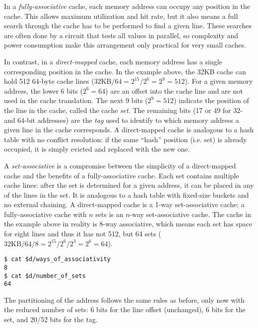 In a \textit{fully-associative} cache, each memory address can occupy any
position in the cache.  This allows maximum utilization and hit rate, but it
also means a full search through the cache has to be performed to find a given
line.  These searches are often done by a circuit that tests all values in
parallel, so complexity and power consumption make this arrangement only
practical for very small caches.

In contrast, in a \textit{direct-mapped} cache, each memory address has a single
corresponding position in the cache.  In the example above, the 32KB cache can
hold 512 64-byte cache lines ($32\text{KB} / 64 = 2^{15} / 2^6 = 2^9 = 512$).
For a given memory address, the lower 6 bits ($2^6 = 64$) are an offset into the
cache line and are not used in the cache translation.  The next 9 bits ($2^9 =
512$) indicate the position of the line in the cache, called the cache
\textit{set}.  The remaining bits (17 or 49 for 32- and 64-bit addresses) are
the \textit{tag} used to identify to which memory address a given line in the
cache corresponds.  A direct-mapped cache is analogous to a hash table with no
conflict resolution: if the same ``hash'' position (i.e. set) is already
occupied, it is simply evicted and replaced with the new one.

A \textit{set-associative} is a compromise between the simplicity of a
direct-mapped cache and the benefits of a fully-associative cache.  Each set
contains multiple cache lines: after the set is determined for a given address,
it can be placed in any of the lines in the set.  It is analogous to a hash
table with fixed-size buckets and no external chaining.  A direct-mapped cache
is a 1-way set-associative cache; a fully-associative cache with $n$ sets is an
$n$-way set-associative cache.  The cache in the example above in reality is
8-way associative, which means each set has space for eight lines and thus it
has not 512, but 64 sets ($32\text{KB} / 64 / 8 = 2^{15} / 2^6 / 2^3 = 2^6 =
64$).

\begin{lstlisting}
$ cat $d/ways_of_associativity
8
$ cat $d/number_of_sets
64
\end{lstlisting}

The partitioning of the address follows the same rules as before, only now with
the reduced number of sets: 6 bits for the line offset (unchanged), 6 bits for
the set, and 20/52 bits for the tag.
